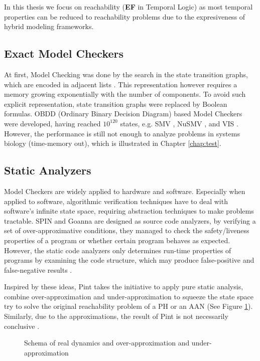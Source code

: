 In this thesis we focus on reachability (\textbf{EF} in Temporal Logic) as most temporal properties can be reduced to reachability problems due to the expresiveness of hybrid modeling frameworks.

\subsection{Exact Model Checkers}
At first, Model Checking was done by the search in the state transition graphs, which are encoded in adjacent lists \cite{clarke1981design}.
This representation however requires a memory growing exponentially with the number of components.
To avoid such explicit representation, state transition graphs were replaced by Boolean formulas.
OBDD (Ordinary Binary Decision Diagram) based Model Checkers were developed, having reached $10^{120}$ states, e.g.
SMV \cite{mcmillan1993symbolic}, NuSMV \cite{cimatti2000nusmv}, and VIS \cite{brayton1996vis}.
However, the performance is still not enough to analyze problems in systems biology (time-memory out), which is illustrated in Chapter \ref{chap:test}.  

\subsection{Static Analyzers}
Model Checkers are widely applied to hardware and software.
Especially when applied to software, algorithmic verification techniques have
to deal with software’s infinite state space, requiring abstraction techniques to make problems tractable.
SPIN \cite{holzmann1997model} and Goanna \cite{fehnker2006goanna} are designed as source code analyzers, by verifying a set of over-approximative conditions, they managed to check the safety/liveness properties of a program or whether certain program behaves as expected. 
However, the static code analyzers only determines run-time properties of programs by examining the code structure, which may produce false-positive and false-negative results \cite{vorobyov2010comparing}.

Inspired by these ideas, Pint \cite{Pint} takes the initiative to apply pure static analysis, combine over-approximation and under-approximation to squeeze the state space try to solve the original reachability problem of a PH or an AAN (See Figure \ref{fig:vennDiagram}).
Similarly, due to the approximations, the result of Pint is not necessarily conclusive \cite{folschette2015}.

\begin{figure}[ht]
    \centering
    
    \caption[Static analysis]{Schema of real dynamics and over-approximation and under-approximation}
    \label{fig:vennDiagram}
\end{figure}

